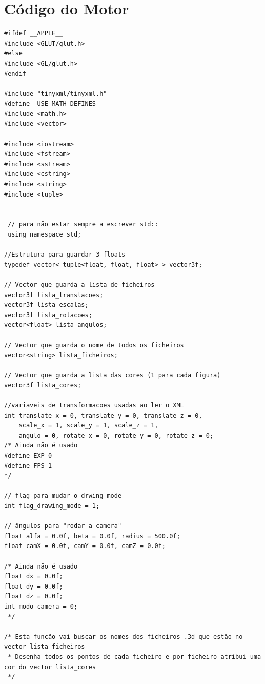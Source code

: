 \documentclass{report}
\begin{document}
\section{C\'odigo do Motor}
\begin{lstlisting}
#ifdef __APPLE__
#include <GLUT/glut.h>
#else
#include <GL/glut.h>
#endif

#include "tinyxml/tinyxml.h"
#define _USE_MATH_DEFINES
#include <math.h>
#include <vector>

#include <iostream>
#include <fstream>
#include <sstream>
#include <cstring>
#include <string>
#include <tuple>


 // para não estar sempre a escrever std::
 using namespace std;

//Estrutura para guardar 3 floats
typedef vector< tuple<float, float, float> > vector3f;

// Vector que guarda a lista de ficheiros
vector3f lista_translacoes;
vector3f lista_escalas;
vector3f lista_rotacoes;
vector<float> lista_angulos;

// Vector que guarda o nome de todos os ficheiros
vector<string> lista_ficheiros;

// Vector que guarda a lista das cores (1 para cada figura)
vector3f lista_cores; 

//variaveis de transformacoes usadas ao ler o XML
int translate_x = 0, translate_y = 0, translate_z = 0,
    scale_x = 1, scale_y = 1, scale_z = 1,
    angulo = 0, rotate_x = 0, rotate_y = 0, rotate_z = 0;
/* Ainda não é usado
#define EXP 0
#define FPS 1
*/

// flag para mudar o drwing mode
int flag_drawing_mode = 1; 

// ângulos para "rodar a camera" 
float alfa = 0.0f, beta = 0.0f, radius = 500.0f;
float camX = 0.0f, camY = 0.0f, camZ = 0.0f;

/* Ainda não é usado
float dx = 0.0f;
float dy = 0.0f;
float dz = 0.0f;
int modo_camera = 0;
 */

/* Esta função vai buscar os nomes dos ficheiros .3d que estão no vector lista_ficheiros
 * Desenha todos os pontos de cada ficheiro e por ficheiro atribui uma cor do vector lista_cores
 */


\end{lstlisting}
\end{document}

